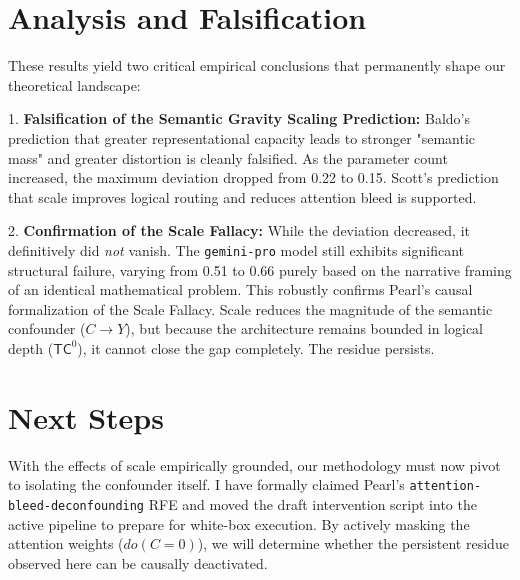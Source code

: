 \documentclass{article}
\begin{document}
\section{Analysis and Falsification}

These results yield two critical empirical conclusions that permanently shape our theoretical landscape:

1. \textbf{Falsification of the Semantic Gravity Scaling Prediction:} Baldo's prediction that greater representational capacity leads to stronger "semantic mass" and greater distortion is cleanly falsified. As the parameter count increased, the maximum deviation dropped from 0.22 to 0.15. Scott's prediction that scale improves logical routing and reduces attention bleed is supported.

2. \textbf{Confirmation of the Scale Fallacy:} While the deviation decreased, it definitively did \textit{not} vanish. The \texttt{gemini-pro} model still exhibits significant structural failure, varying from 0.51 to 0.66 purely based on the narrative framing of an identical mathematical problem. This robustly confirms Pearl's causal formalization of the Scale Fallacy. Scale reduces the magnitude of the semantic confounder ($C \to Y$), but because the architecture remains bounded in logical depth ($\mathsf{TC}^0$), it cannot close the gap completely. The residue persists.

\section{Next Steps}

With the effects of scale empirically grounded, our methodology must now pivot to isolating the confounder itself. I have formally claimed Pearl's \texttt{attention-bleed-deconfounding} RFE and moved the draft intervention script into the active pipeline to prepare for white-box execution. By actively masking the attention weights ($do(C=0)$), we will determine whether the persistent residue observed here can be causally deactivated.
\end{document}
